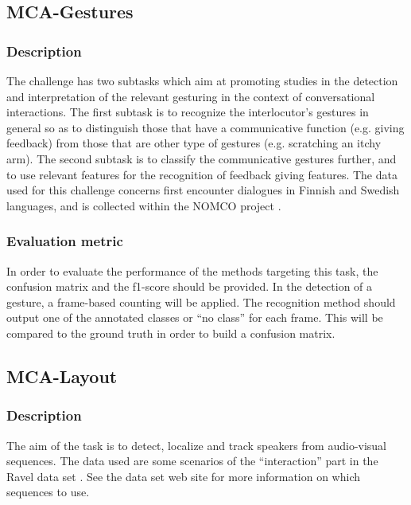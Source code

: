 \documentclass[a4paper]{article}
\begin{document}
\subsection*{MCA-Gestures}
\subsubsection*{Description}
The challenge has two subtasks which aim at promoting studies in the detection and interpretation of the relevant
gesturing in the context of conversational interactions. The first subtask is to recognize the interlocutor’s gestures
in general so as to distinguish those that have a communicative function (e.g. giving feedback) from those that are
other type of gestures (e.g. scratching an itchy arm). The second subtask is to classify the communicative gestures
further, and to use relevant features for the recognition of feedback giving features. The data used for this challenge
concerns first encounter dialogues in Finnish and Swedish languages, and is collected within the NOMCO project
\cite{Nomco,Navarreta}. 
\subsubsection*{Evaluation metric}
In order to evaluate the performance of the methods targeting this task, the confusion matrix and the f1-score should be
provided. In the detection of a gesture, a frame-based counting will be applied. The recognition method should output
one of the annotated classes or “no class” for each frame. This will be compared to the ground truth in order to build a
confusion matrix.

\subsection*{MCA-Layout}
\subsubsection*{Description}
The aim of the task is to detect, localize and track speakers from audio-visual sequences. The data used are some
scenarios of the “interaction” part in the Ravel data set \cite{Ravel}. See the data set web site \cite{RavelWeb} for
more information on which sequences to use.
\end{document}
